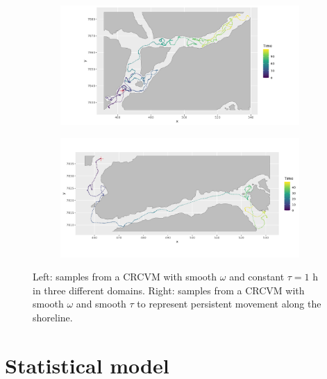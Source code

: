 \documentclass[11pt]{article}
\newcommand {\1}{\mathbb{1}}
\theoremstyle{definition}
\theoremstyle{remark}
\theoremstyle{remark}
\begin{document}
\begin{figure}[H]
 	\begin{subfigure}{0.48\textwidth}
 		\centering
 		\includegraphics[scale=0.3]{images/crcvm/illustrative_sample_fjords_standard}
 		\label{fig:illustrativesamplefjordsstandard}
 	\end{subfigure}	
 	\begin{subfigure}{0.48\textwidth}
 		\centering
 		\includegraphics[scale=0.3]{images/crcvm/illustrative_sample_fjords_pers}
 		\label{fig:illustrativesamplefjordspers}
 	\end{subfigure}
 	\caption{Left: samples from a CRCVM with smooth $\omega$ and constant $\tau=1$ h in three different domains. Right: samples from a CRCVM with smooth $\omega$ and smooth $\tau$ to represent persistent movement along the shoreline.}
 	\label{fig: crcvm examples}
 \end{figure}







\section{Statistical model}
\end{document}
